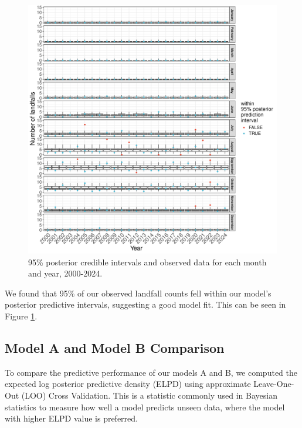 \documentclass[
]{article}
\begin{document}
\begin{figure}

{\centering \includegraphics[width=1\linewidth]{../outputs/bayesian-analysis-monthly-freq/model-no-year-effect/no-year-post-pred-checks} 

}

\caption{95\% posterior credible intervals and observed data for each month and year, 2000-2024.}\label{fig:figs12}
\end{figure}

We found that 95\% of our observed landfall counts fell within our model's posterior predictive intervals, suggesting a good model fit. This can be seen in Figure \ref{fig:figs12}.

\newpage

\subsection{Model A and Model B Comparison}\label{model-a-and-model-b-comparison}

To compare the predictive performance of our models A and B, we computed the expected log posterior predictive density (ELPD) using approximate Leave-One-Out (LOO) Cross Validation. This is a statistic commonly used in Bayesian statistics to measure how well a model predicts unseen data, where the model with higher ELPD value is preferred.
\end{document}
